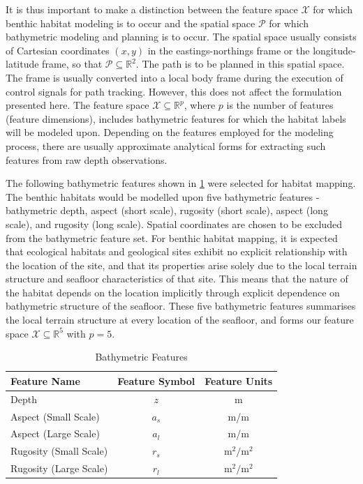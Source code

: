 		It is thus important to make a distinction between the feature space $\mathcal{X}$ for which benthic habitat modeling is to occur and the spatial space $\mathcal{P}$ for which bathymetric modeling and planning is to occur. The spatial space usually consists of Cartesian coordinates $(x, y)$ in the eastings-northings frame or the longitude-latitude frame, so that $\mathcal{P} \subseteq \mathbb{R}^{2}$. The path is to be planned in this spatial space. The frame is usually converted into a local body frame during the execution of control signals for path tracking. However, this does not affect the formulation presented here. The feature space $\mathcal{X} \subseteq \mathbb{R}^{p}$, where $p$ is the number of features (feature dimensions), includes bathymetric features for which the habitat labels will be modeled upon. Depending on the features employed for the modeling process, there are usually approximate analytical forms for extracting such features from raw depth observations.
		
		The following bathymetric features shown in \cref{Table:BathymetricFeatures} were selected for habitat mapping. The benthic habitats would be modelled upon five bathymetric features - bathymetric depth, aspect (short scale), rugosity (short scale), aspect (long scale), and rugosity (long scale). Spatial coordinates are chosen to be excluded from the bathymetric feature set. For benthic habitat mapping, it is expected that ecological habitats and geological sites exhibit no explicit relationship with the location of the site, and that its properties arise solely due to the local terrain structure and seafloor characteristics  of that site. This means that the nature of the habitat depends on the location implicitly through explicit dependence on bathymetric structure of the seafloor. These five bathymetric features summarises the local terrain structure at every location of the seafloor, and forms our feature space $\mathcal{X} \subseteq \mathbb{R}^{5}$ with $p = 5$.
		
		\begin{table}[h]
			\begin{center}
				\begin{tabular}{ l c c }
					\hline
					\hline
					Feature Name & Feature Symbol & Feature Units \\
					\hline
					\hline
					Depth & $z$ & m \\
					Aspect (Small Scale) & $a_{s}$ & m/m \\
					Aspect (Large Scale) & $a_{l}$& m/m \\
					Rugosity (Small Scale) & $r_{s}$ & $\mathrm{m^{2}/m^{2}}$ \\
					Rugosity (Large Scale) & $r_{l}$ & $\mathrm{m^{2}/m^{2}}$  \\
					\hline
					\hline
				\end{tabular}
			\end{center}
	  	\caption{Bathymetric Features}
	  	\label{Table:BathymetricFeatures}			
	  	\end{table}	
		

